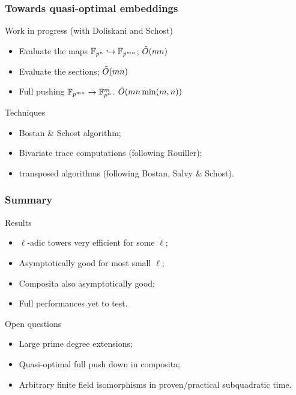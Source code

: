 \documentclass[12pt]{beamer}
\begin{document}

\begin{frame}
  \frametitle{Towards quasi-optimal embeddings}

  \begin{block}{Work in progress (with Doliskani and Schost)}
    \begin{itemize}
    \item Evaluate the maps $\mathbb{F}_{p^n}\hookrightarrow\mathbb{F}_{p^{mn}}$; \hfill
      \alert{$\tilde{O}(mn)$}
    \item Evaluate the sections; \hfill \alert{$\tilde{O}(mn)$}
    \item Full pushing $\mathbb{F}_{p^{mn}} \to \mathbb{F}_{p^n}^m$. \hfill \alert{$\tilde{O}(mn\min(m,n))$}
    \end{itemize}
  \end{block}

  \begin{block}{Techniques}
    \begin{itemize}
    \item Bostan \& Schost algorithm;
    \item Bivariate trace computations (following Rouiller);
    \item transposed algorithms (following Bostan, Salvy \& Schost).
    \end{itemize}
  \end{block}
\end{frame}


\begin{frame}
  \frametitle{Summary}

  \begin{block}{Results}
    \begin{itemize}
    \item $\ell$-adic towers very efficient for some $\ell$;
    \item Asymptotically good for most small $\ell$;
    \item Composita also asymptotically good;
    \item Full performances yet to test.
    \end{itemize}
  \end{block}

  \begin{block}{Open questions}
    \begin{itemize}
    \item Large prime degree extensions;
    \item Quasi-optimal full push down in composita;
    \item Arbitrary finite field isomorphisms in proven/practical
      subquadratic time.
    \end{itemize}
  \end{block}
\end{frame}
\end{document}
